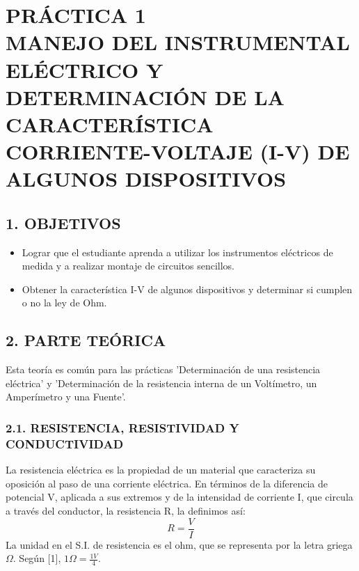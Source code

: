 \documentclass[12pt, a4paper]{article}
\begin{document}

{
  \hypersetup{linkcolor=black} %
  \tableofcontents
  \newpage
  \listoffigures
  \newpage
  \listoftables
  \newpage
}

\section*{\centering PRÁCTICA 1 \\ MANEJO DEL INSTRUMENTAL ELÉCTRICO Y DETERMINACIÓN DE LA 
CARACTERÍSTICA CORRIENTE-VOLTAJE (I-V) DE ALGUNOS DISPOSITIVOS}
 
\subsection*{1. OBJETIVOS}
\begin{itemize}
    \item Lograr que el estudiante aprenda a utilizar los instrumentos eléctricos de medida y a 
    realizar montaje de circuitos sencillos.
    \item Obtener la característica I-V de algunos dispositivos y determinar si cumplen o no la ley 
    de Ohm.
\end{itemize}

\subsection*{2. PARTE TEÓRICA}
Esta teoría es común para las prácticas 'Determinación de una resistencia eléctrica' y 
'Determinación de la resistencia interna de un Voltímetro, un Amperímetro y una Fuente'.

\subsubsection*{2.1. RESISTENCIA, RESISTIVIDAD Y CONDUCTIVIDAD}
La resistencia eléctrica es la propiedad de un material que caracteriza su oposición al paso de 
una corriente eléctrica. En términos de la diferencia de potencial V, aplicada a sus extremos y de 
la intensidad de corriente I, que circula a través del conductor, la resistencia R, la definimos 
así:
\begin{equation}
    R = \frac{V}{I}
    \label{eq:ohm_basica}
\end{equation}
La unidad en el S.I. de resistencia es el ohm, que se representa por la letra griega $\Omega$. 
Según [1], $1\Omega = \frac{1V}{4}$.
\end{document}
